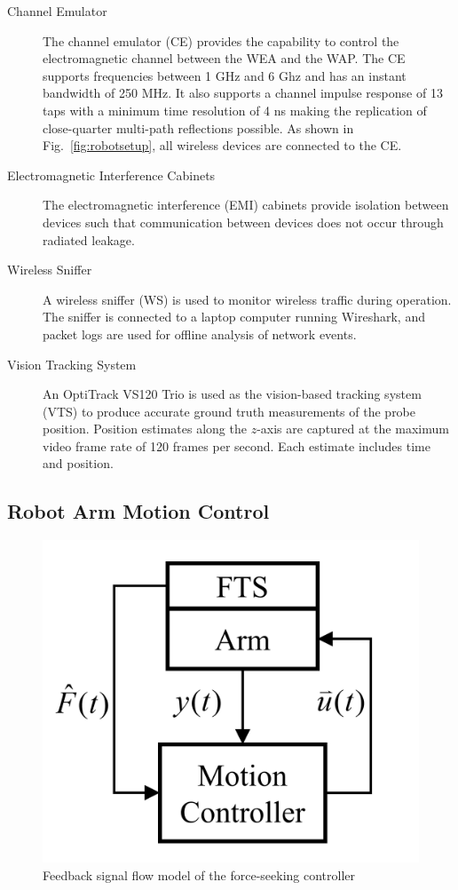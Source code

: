 \begin{description}
	\item[Channel Emulator] The channel emulator (CE) provides the capability to control the electromagnetic channel between the WEA and the WAP.  The CE supports frequencies between 1 GHz and 6 Ghz and has an instant bandwidth of 250 MHz. It also supports a channel impulse response of 13 taps with a minimum time resolution of 4 ns making the replication of close-quarter multi-path reflections possible.  As shown in Fig.~\ref{fig:robotsetup}, all wireless devices are connected to the CE.
	
	\item[Electromagnetic Interference Cabinets] The electromagnetic interference (EMI) cabinets provide isolation between devices such that communication between devices does not occur through radiated leakage.
	
	\item[Wireless Sniffer]  A wireless sniffer (WS) is used to monitor wireless traffic during operation. The sniffer is connected to a laptop computer running Wireshark, and packet logs are used for offline analysis of network events.
	
	\item[Vision Tracking System]  An OptiTrack VS120 Trio is used as the vision-based tracking system (VTS) to produce accurate ground truth measurements of the probe position.  Position estimates along the $z$-axis are captured at the maximum video frame rate of 120 frames per second.  Each estimate includes time and position.
	
\end{description}

\subsection{Robot Arm Motion Control}

\begin{figure}[tbp]
	\centering
	\includegraphics[width=0.4\columnwidth]{./chapter-ftml/diagrams/reef-model}
	\caption{Feedback signal flow model of the force-seeking controller}
	\label{fig:reefmodel}
\end{figure}

